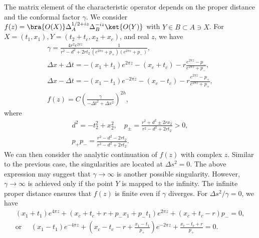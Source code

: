 \documentclass[a4paper,11pt]{article}
\theoremstyle{definition}
\theoremstyle{remark}
\begin{document}
The matrix element of the characteristic operator depends on the proper distance and the conformal factor $\gamma$. We consider $f(z)=\bra{O(X)}\Delta_A^{1/2+iz}\Delta_B^{-iz}\ket{O(Y)}$ with $Y\in B \subset A\ni X$. For $X = (t_1,x_1), Y = (t_2+t_c,x_2+x_c)$, and real $z$, we have
\begin{gather}
    \gamma= \frac{4r^2 e^{2\pi z}}{r^2-d^2+2rt_2} \frac{1}{(e^{2\pi z} + p_+)(e^{2\pi z} + p_-)},\\
    \Delta x + \Delta t = -(x_1+t_1)e^{2\pi z} - (x_c+t_c) - r\frac{e^{2\pi z}-p_-}{e^{2\pi z}+p_-},\\
    \Delta x - \Delta t = - (x_1-t_1)e^{-2\pi z} - (x_c-t_c) - r\frac{e^{2\pi z}-p_+}{e^{2\pi z}+p_+},\\
    f(z) = C \left(\frac{\gamma}{-\Delta t^2 + \Delta x^2} \right)^{2h},
\end{gather}
where
\begin{gather}
    d^2 = -t_2^2 + x_2^2, \quad p_\pm = \frac{r^2+d^2\pm 2rx_2}{r^2-d^2+2rt_2} > 0,\\
    p_+p_- = \frac{r^2-d^2-2rt_2}{r^2-d^2+2rt_2}.
\end{gather}
We can then consider the analytic continuation of $f(z)$ with complex $z$. Similar to the previous case, the singularities are located at $\Delta s^2 = 0$. The above expression may suggest that $\gamma \to \infty$ is another possible singularity. However, $\gamma \to \infty$ is achieved only if the point $Y$ is mapped to the infinity. The infinite proper distance ensures that $f(z)$ is finite even if $\gamma$ diverges. For $\Delta s^2/\gamma = 0$, we have
\begin{gather}
    (x_1+t_1)e^{4\pi z} +  (x_c + t_c + r + p_-x_1+ p_-t_1)e^{2\pi z}+ (x_c+t_c-r) p_-  = 0,\\
    \text{or } \quad (x_1-t_1)e^{-4\pi z}+ \left(x_c - t_c - r+\frac{x_1-t_1}{p_+}\right)e^{-2\pi z} + \frac{x_c-t_c + r}{p_+} = 0.
\end{gather}
\end{document}
